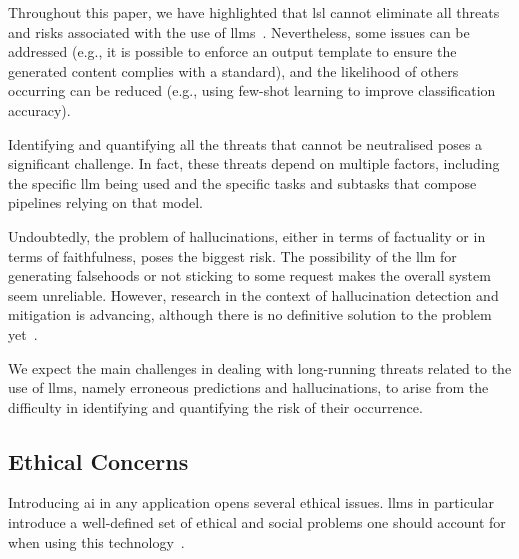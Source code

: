 \documentclass[manuscript,screen]{acmart}
\begin{document}
Throughout this paper, we have highlighted that \ac{lsl} cannot eliminate all threats and risks associated with the use of \acp{llm}~\cite{ai2023artificial}.
Nevertheless, some issues can be addressed (e.g., it is possible to enforce an output template to ensure the generated content complies with a standard), and the likelihood of others occurring can be reduced (e.g., using few-shot learning to improve classification accuracy).

Identifying and quantifying all the threats that cannot be neutralised poses a significant challenge.
In fact, these threats depend on multiple factors, including the specific \ac{llm} being used and the specific tasks and subtasks that compose pipelines relying on that model.

Undoubtedly, the problem of hallucinations, either in terms of factuality or in terms of faithfulness, poses the biggest risk.
The possibility of the \ac{llm} for generating falsehoods or not sticking to some request makes the overall system seem unreliable.
However, research in the context of hallucination detection and mitigation is advancing, although there is no definitive solution to the problem yet~\cite{DBLP:journals/csur/JiLFYSXIBMF23,DBLP:journals/corr/huangSurvey}.

\begin{tcolorbox}[
    title=Inherent threats, %
    left=1mm,
    right=1mm,
    top=1mm,
    bottom=1mm,
    fonttitle=\bfseries, %
    boxrule=0.5pt, %
    arc=5pt, %
    width=\columnwidth %
]
We expect the main challenges in dealing with long-running threats related to the use of \acp{llm}, namely erroneous predictions and hallucinations, to arise from the difficulty in identifying and quantifying the risk of their occurrence.
\end{tcolorbox}

\subsection{Ethical Concerns}
\label{sec:ethicalconcerns}



Introducing \ac{ai} in any application opens several ethical issues.
\acp{llm} in particular introduce a well-defined set of ethical and social problems one should account for when using this technology~\cite{DBLP:journals/corr/abs-2112-04359}.
\end{document}
